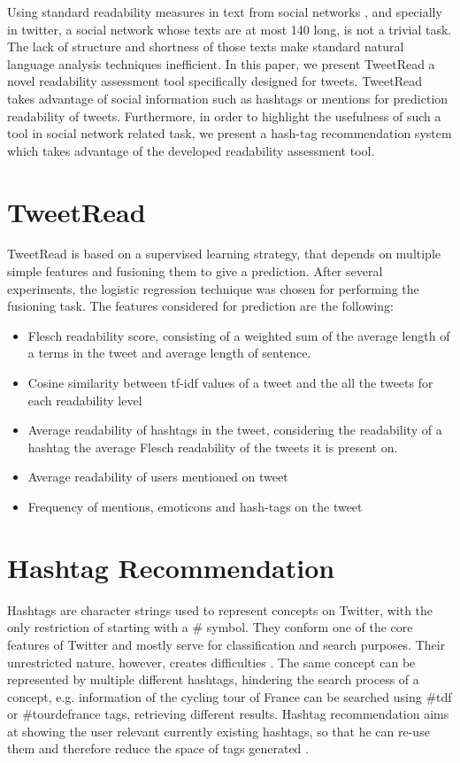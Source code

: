\documentclass{sig-alternate-05-2015}
\begin{document}
Using standard readability measures in text from social networks , and specially in twitter, a social network whose texts are at most 140 long, is not a trivial task. The lack of structure and shortness of those texts make standard natural language analysis techniques inefficient. In this paper, we present TweetRead a novel readability assessment tool specifically designed for tweets. TweetRead takes advantage of social information such as hashtags or mentions for prediction readability of tweets. Furthermore, in order to highlight the usefulness of such a tool in social network related task, we present a hash-tag recommendation system which takes advantage of the developed readability assessment tool.


\section{TweetRead}
TweetRead is based on a supervised learning strategy, that depends on multiple simple features and fusioning them to give a prediction. After several experiments, the logistic regression technique was chosen for performing the fusioning task. The features considered for prediction are the following:
\begin{itemize}
\item Flesch \cite{Fle48} readability score, consisting of a weighted sum of the average length of a terms in the tweet and average length of sentence.
\item Cosine similarity between tf-idf values of a tweet and the all the tweets for each readability level
\item Average readability of hashtags in the tweet, considering the readability of a hashtag the average Flesch readability of the tweets it is present on.
\item Average readability of users mentioned on tweet
\item Frequency of mentions, emoticons and hash-tags on the tweet

\end{itemize}




\section{Hashtag Recommendation}
Hashtags are character strings  used to represent concepts on Twitter, with the only restriction of starting with a \# symbol. They conform one of the core features of Twitter and mostly serve for classification and search purposes. Their unrestricted nature, however, creates difficulties \cite{hashtagRec}. The same concept can be represented by multiple different hashtags, hindering the search process of a concept, e.g. information of the cycling tour of France can be searched using \#tdf or \#tourdefrance tags, retrieving different results. Hashtag recommendation aims at showing the user relevant currently existing hashtags, so that he can re-use them and therefore reduce the space of tags generated \cite{hashtagRec}. 
\end{document}
